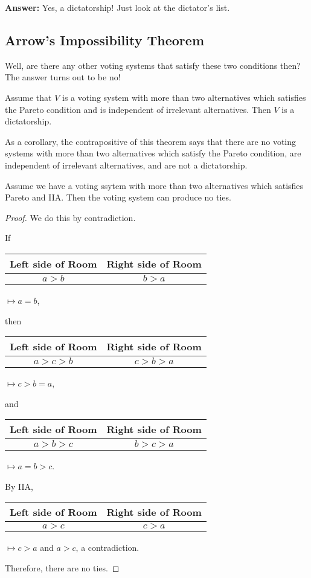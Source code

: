 \noindent\textbf{Answer:} Yes, a dictatorship! Just look at the dictator's list.
\subsection{Arrow's Impossibility Theorem}
Well, are there any other voting systems that satisfy these two conditions then? The answer turns out to be no!
\begin{theorem}
    Assume that $V$ is a voting system with more than two alternatives which satisfies the Pareto condition and is independent of irrelevant alternatives. Then $V$ is a dictatorship.
\end{theorem}
As a corollary, the contrapositive of this theorem says that there are no voting systems with more than two alternatives which satisfy the Pareto condition, are independent of irrelevant alternatives, and are not a dictatorship.
\orbreak
\begin{prop}[No ties]
   Assume we have a voting ssytem with more than two alternatives which satisfies Pareto and IIA. Then the voting system can produce no ties. 
\end{prop}
\begin{proof}
    We do this by contradiction. 

    If 
    \begin{tabular}{c|c}
        Left side of Room & Right side of Room \\
        \hline
        $a>b$ & $b>a$
    \end{tabular} $\mapsto a=b$,

    then \begin{tabular}{c|c}
        Left side of Room & Right side of Room \\
        \hline
        $a>c>b$ & $c>b>a$
    \end{tabular} $\mapsto c>b=a$,

    and \begin{tabular}{c|c}
        Left side of Room & Right side of Room \\
        \hline
        $a>b>c$ & $b>c>a$
    \end{tabular} $\mapsto a=b>c$.

    By IIA, \begin{tabular}{c|c}
        Left side of Room & Right side of Room \\
        \hline
        $a>c$ & $c>a$
    \end{tabular} $\mapsto c>a$ and $a>c$, a contradiction.

    Therefore, there are no ties. \textreferencemark
\end{proof}
